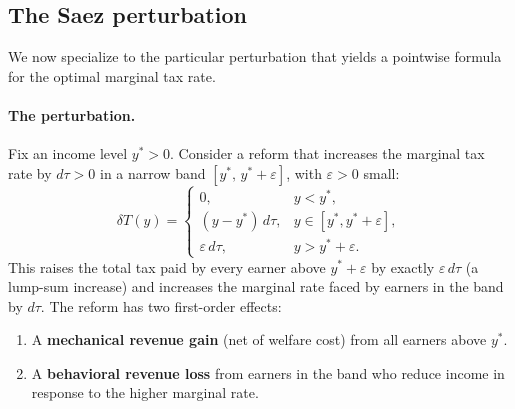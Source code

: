 \documentclass[12pt,a4paper]{article}
\theoremstyle{definition}
\theoremstyle{plain}
\theoremstyle{remark}
\begin{document}
\subsection{The Saez perturbation}
\label{sec:saez-specific}

We now specialize to the particular perturbation that yields a pointwise formula for the optimal marginal tax rate.

\paragraph{The perturbation.}
Fix an income level $y^*>0$. Consider a reform that increases
the marginal tax rate by $d\tau>0$ in a narrow band
$[y^*,\,y^*+\varepsilon]$, with $\varepsilon>0$ small:
\[
\delta T(y)
=
\begin{cases}
0, & y < y^*,\\
(y-y^*)\,d\tau, & y\in[y^*,y^*+\varepsilon],\\
\varepsilon\,d\tau, & y > y^*+\varepsilon.
\end{cases}
\]
This raises the total tax paid by every earner above
$y^*+\varepsilon$ by exactly $\varepsilon\,d\tau$ (a lump-sum increase) and increases
the marginal rate faced by earners in the band by $d\tau$. The reform
has two first-order effects:

\begin{enumerate}
\item A \textbf{mechanical revenue gain} (net of welfare cost)
  from all earners above $y^*$.
\item A \textbf{behavioral revenue loss} from earners in the
  band who reduce income in response to the higher marginal rate.
\end{enumerate}
\end{document}
